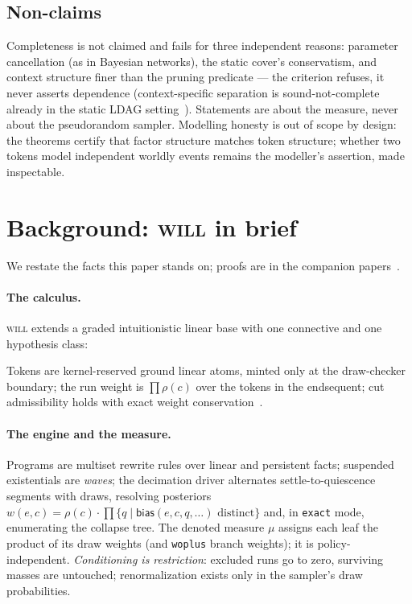 \documentclass[11pt]{article}
\newcommand{\erho}[2]{\exists_{\rho}\, #1{:}#2.\;}
\newcommand{\dtok}[2]{\mathsf{drawn}\;#1\;#2}
\newcommand{\seq}[3]{#1;\;#2\vdash #3}
\newcommand{\will}{\textsc{will}}
\theoremstyle{definition}
\theoremstyle{remark}
\begin{document}
\subsection{Non-claims}

Completeness is not claimed and fails for three independent reasons:
parameter cancellation (as in Bayesian networks), the static cover's
conservatism, and context structure finer than the pruning predicate
--- the criterion refuses, it never asserts dependence
(context-specific separation is sound-not-complete already in the
static LDAG setting~\cite{Pensar2015}).  Statements are about the
measure, never about the pseudorandom sampler.  Modelling honesty is
out of scope by design: the theorems certify that factor structure
matches token structure; whether two tokens model independent worldly
events remains the modeller's assertion, made inspectable.

\section{Background: \will{} in brief}
\label{sec:background}

We restate the facts this paper stands on; proofs are in the companion
papers~\cite{WillPaper,TillPaper}.

\paragraph{The calculus.}  \will{} extends a graded intuitionistic
linear base with one connective and one hypothesis class:
%
%
Tokens are kernel-reserved ground linear atoms, minted only at the
draw-checker boundary; the run weight is $\prod\rho(c)$ over the
tokens in the endsequent; cut admissibility holds with exact weight
conservation~\cite{WillPaper}.

\paragraph{The engine and the measure.}  Programs are multiset rewrite
rules over linear and persistent facts; suspended existentials are
\emph{waves}; the decimation driver alternates settle-to-quiescence
segments with draws, resolving posteriors
$w(e,c) = \rho(c)\cdot\prod\{q \mid \mathsf{bias}(e,c,q,\ldots)
\text{ distinct}\}$ and, in \texttt{exact} mode, enumerating the
collapse tree.  The denoted measure $\mu$ assigns each leaf the product
of its draw weights (and \texttt{woplus} branch weights); it is
policy-independent.  \emph{Conditioning is restriction}: excluded runs
go to zero, surviving masses are untouched; renormalization exists only
in the sampler's draw probabilities.
\end{document}
